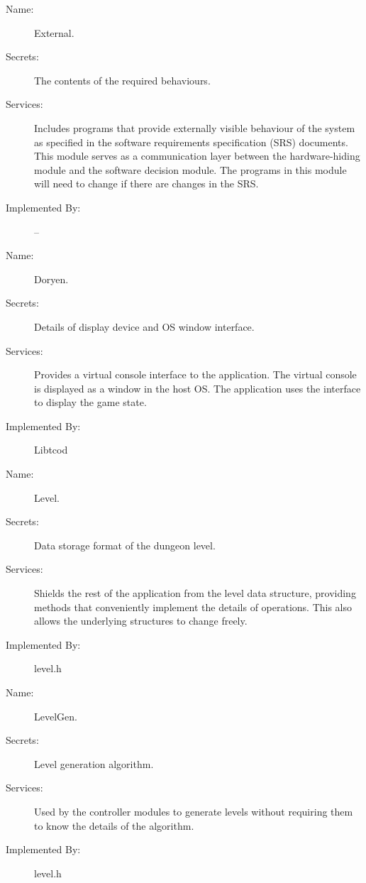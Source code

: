 \documentclass[12pt, titlepage]{article}
\begin{document}
		\bigskip\begin{description}
			\item[Name:]External.
			\item[Secrets:]The contents of the required behaviours.
			\item[Services:]Includes programs that provide externally visible behaviour of the system as specified in the software requirements specification (SRS) documents. This module serves as a communication layer between the hardware-hiding module and the software decision module. The programs in this module will need to change if there are changes in the SRS.
			\item[Implemented By:] --
		\end{description}

		\bigskip\begin{description}
			\item[Name:]Doryen.
			\item[Secrets:]Details of display device and OS window interface.
			\item[Services:]Provides a virtual console interface to the application. The virtual console is displayed as a window in the host OS. The application uses the interface to display the game state.
			\item[Implemented By:]Libtcod
		\end{description}

		\bigskip\begin{description}
			\item[Name:]Level.
			\item[Secrets:]Data storage format of the dungeon level.
			\item[Services:]Shields the rest of the application from the level data structure, providing methods that conveniently implement the details of operations. This also allows the underlying structures to change freely.
			\item[Implemented By:]level.h
		\end{description}

		\bigskip\begin{description}
			\item[Name:]LevelGen.
			\item[Secrets:]Level generation algorithm.
			\item[Services:]Used by the controller modules to generate levels without requiring them to know the details of the algorithm.
			\item[Implemented By:]level.h
		\end{description}
\end{document}
